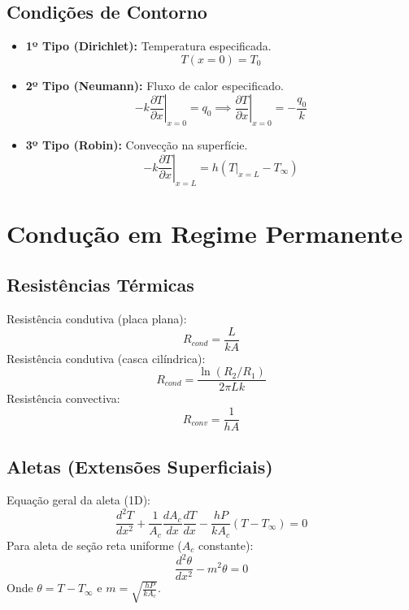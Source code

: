 \documentclass[12pt, a4paper]{article}
\begin{document}
\subsection{Condições de Contorno}
\begin{itemize}
    \item \textbf{1º Tipo (Dirichlet):} Temperatura especificada.
    \begin{equation*}
        T(x=0) = T_0
    \end{equation*}
    \item \textbf{2º Tipo (Neumann):} Fluxo de calor especificado.
    \begin{equation*}
        -k \left. \frac{\partial T}{\partial x} \right|_{x=0} = q_0 \implies \left. \frac{\partial T}{\partial x} \right|_{x=0} = -\frac{q_0}{k}
    \end{equation*}
    \item \textbf{3º Tipo (Robin):} Convecção na superfície.
    \begin{equation*}
        -k \left. \frac{\partial T}{\partial x} \right|_{x=L} = h (T|_{x=L} - T_{\infty})
    \end{equation*}
\end{itemize}

\newpage

\section{Condução em Regime Permanente}

\subsection{Resistências Térmicas}
Resistência condutiva (placa plana):
\begin{equation}
    R_{cond} = \frac{L}{kA}
\end{equation}
Resistência condutiva (casca cilíndrica):
\begin{equation}
    R_{cond} = \frac{\ln(R_2/R_1)}{2 \pi L k}
\end{equation}
Resistência convectiva:
\begin{equation}
    R_{conv} = \frac{1}{hA}
\end{equation}

\subsection{Aletas (Extensões Superficiais)}
Equação geral da aleta (1D):
\begin{equation}
    \frac{d^2T}{dx^2} + \frac{1}{A_c}\frac{dA_c}{dx}\frac{dT}{dx} - \frac{hP}{kA_c}(T-T_\infty) = 0
\end{equation}
Para aleta de seção reta uniforme ($A_c$ constante):
\begin{equation}
    \frac{d^2\theta}{dx^2} - m^2\theta = 0
\end{equation}
Onde $\theta = T - T_\infty$ e $m = \sqrt{\frac{hP}{kA_c}}$.
\end{document}
